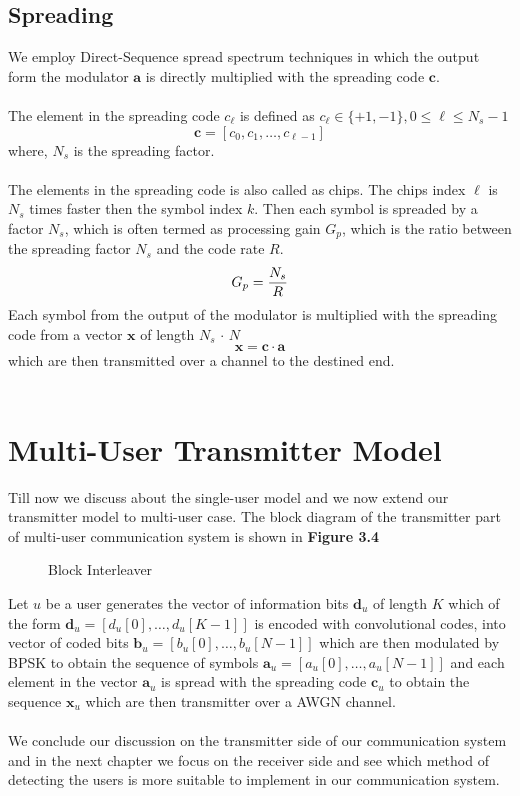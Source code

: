 \subsection{Spreading}
We employ Direct-Sequence spread spectrum techniques in which the output form the modulator $\mathrm{\mathbf{a}}$ is directly multiplied with the spreading code $\mathrm{\mathbf{c}}$.\\ \\
The element in the spreading code $c_\ell$ is defined as $c_\ell \in \{+1,-1\}, 0 \leq \ell \leq N_s-1$ 
\begin{equation}
\mathrm{\mathbf{c}}=[c_0,c_1,\dots,c_{\ell-1}]
\end{equation}
where, $N_s$ is the spreading factor.\\ \\
The elements in the spreading code is also called as chips. The chips index $\ell$ is $N_s$ times faster then the symbol index $k$. Then each symbol is spreaded by a factor $N_s$, which is often termed as processing gain $G_p$, which is the ratio between the spreading factor $N_s$ and the code rate $R$.
\begin{equation}
G_p=\frac{\hbox{$N_s$}}{\hbox{$R$}}
\end{equation}
Each symbol from the output of the modulator is multiplied with the spreading code from a vector $\mathrm{\mathbf{x}}$ of length $N_s\,\cdot\, N$
\begin{equation}
\mathrm{\mathbf{x}} = \mathrm{\mathbf{c}} \cdot \mathrm{\mathbf{a}} 
\end{equation}
which are then transmitted over a channel to the destined end. \\ \\
\section{Multi-User Transmitter Model}
Till now we discuss about the single-user model and we now extend our transmitter model to multi-user case. The block diagram of the transmitter part of multi-user communication system is shown in \textbf{Figure 3.4}
\begin{figure}[htb]
\centerline{  }
\caption{Block Interleaver}
\end{figure}
Let $u$ be a user generates the vector of information bits $\mathrm{\mathbf{d}}_u$ of length $K$ which of the form $\mathrm{\mathbf{d}}_u=[d_u[0],\dots,d_u[K-1]]$ is encoded with convolutional codes, into vector of coded bits $\mathrm{\mathbf{b}}_u=[b_u[0],\dots,b_u[N-1]]$ which are then modulated by BPSK to obtain the sequence of symbols $\mathrm{\mathbf{a}}_u=[a_u[0],\dots,a_u[N-1]]$ and each element in the vector $\mathrm{\mathbf{a}}_u$ is spread with the spreading code $\mathrm{\mathbf{c}}_u$ to obtain the sequence $\mathrm{\mathbf{x}}_u$ which are then transmitter over a AWGN channel. \\ \\
We conclude our discussion on the transmitter side of our communication system and in the next chapter we focus on the receiver side and see which method of detecting the users is more suitable to implement in our communication system.
